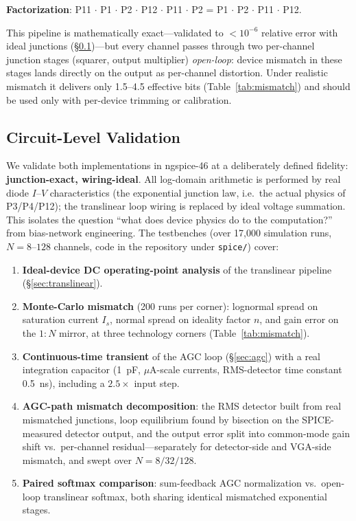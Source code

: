\documentclass[11pt]{article}
\begin{document}
\textbf{Factorization}: P11 $\cdot$ P1 $\cdot$ P2 $\cdot$ P12 $\cdot$ P11 $\cdot$ P2 = P1 $\cdot$ P2 $\cdot$ P11 $\cdot$ P12.

This pipeline is mathematically exact---validated to $<\!10^{-6}$ relative error with ideal junctions (\S\ref{sec:validation})---but every channel passes through two per-channel junction stages (squarer, output multiplier) \textit{open-loop}: device mismatch in these stages lands directly on the output as per-channel distortion. Under realistic mismatch it delivers only 1.5--4.5 effective bits (Table~\ref{tab:mismatch}) and should be used only with per-device trimming or calibration.

\subsection{Circuit-Level Validation}
\label{sec:validation}

We validate both implementations in ngspice-46 at a deliberately defined fidelity: \textbf{junction-exact, wiring-ideal}. All log-domain arithmetic is performed by real diode $I$--$V$ characteristics (the exponential junction law, i.e.\ the actual physics of P3/P4/P12); the translinear loop wiring is replaced by ideal voltage summation. This isolates the question ``what does device physics do to the computation?'' from bias-network engineering. The testbenches (over 17{,}000 simulation runs, $N=8$--$128$ channels, code in the repository under \texttt{spice/}) cover:

\begin{enumerate}[leftmargin=*]
\item \textbf{Ideal-device DC operating-point analysis} of the translinear pipeline (\S\ref{sec:translinear}).
\item \textbf{Monte-Carlo mismatch} (200 runs per corner): lognormal spread on saturation current $I_s$, normal spread on ideality factor $n$, and gain error on the $1{:}N$ mirror, at three technology corners (Table~\ref{tab:mismatch}).
\item \textbf{Continuous-time transient} of the AGC loop (\S\ref{sec:agc}) with a real integration capacitor (1~pF, $\mu$A-scale currents, RMS-detector time constant 0.5~ns), including a $2.5\times$ input step.
\item \textbf{AGC-path mismatch decomposition}: the RMS detector built from real mismatched junctions, loop equilibrium found by bisection on the SPICE-measured detector output, and the output error split into common-mode gain shift vs.\ per-channel residual---separately for detector-side and VGA-side mismatch, and swept over $N=8/32/128$.
\item \textbf{Paired softmax comparison}: sum-feedback AGC normalization vs.\ open-loop translinear softmax, both sharing identical mismatched exponential stages.
\end{enumerate}
\end{document}
